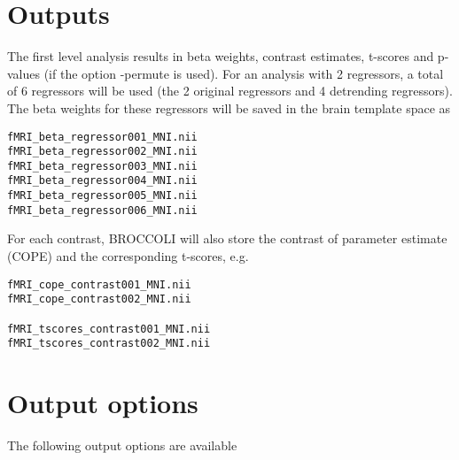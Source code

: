 \section{Outputs}

The first level analysis results in beta weights, contrast estimates, t-scores and p-values (if the option -permute is used). For an analysis with 2 regressors, a total of 6 regressors will be used (the 2 original regressors and 4 detrending regressors). The beta weights for these regressors will be saved in the brain template space as

\begin{verbatim}
fMRI_beta_regressor001_MNI.nii 
fMRI_beta_regressor002_MNI.nii 
fMRI_beta_regressor003_MNI.nii 
fMRI_beta_regressor004_MNI.nii 
fMRI_beta_regressor005_MNI.nii 
fMRI_beta_regressor006_MNI.nii 
\end{verbatim}
For each contrast, BROCCOLI will also store the contrast of parameter estimate (COPE) and the corresponding t-scores, e.g.

\begin{verbatim}
fMRI_cope_contrast001_MNI.nii  
fMRI_cope_contrast002_MNI.nii  

fMRI_tscores_contrast001_MNI.nii
fMRI_tscores_contrast002_MNI.nii
\end{verbatim}

\section{Output options}

The following output options are available

